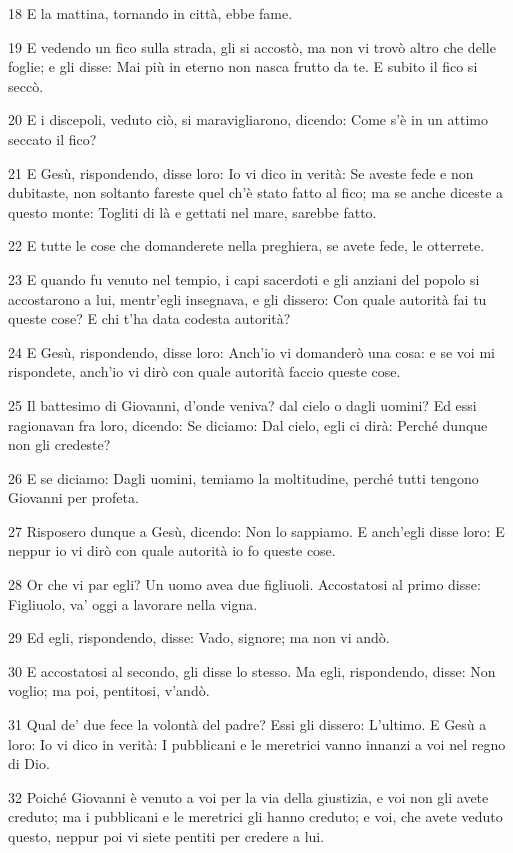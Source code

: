 \par 18 E la mattina, tornando in città, ebbe fame.
\par 19 E vedendo un fico sulla strada, gli si accostò, ma non vi trovò altro che delle foglie; e gli disse: Mai più in eterno non nasca frutto da te. E subito il fico si seccò.
\par 20 E i discepoli, veduto ciò, si maravigliarono, dicendo: Come s'è in un attimo seccato il fico?
\par 21 E Gesù, rispondendo, disse loro: Io vi dico in verità: Se aveste fede e non dubitaste, non soltanto fareste quel ch'è stato fatto al fico; ma se anche diceste a questo monte: Togliti di là e gettati nel mare, sarebbe fatto.
\par 22 E tutte le cose che domanderete nella preghiera, se avete fede, le otterrete.
\par 23 E quando fu venuto nel tempio, i capi sacerdoti e gli anziani del popolo si accostarono a lui, mentr'egli insegnava, e gli dissero: Con quale autorità fai tu queste cose? E chi t'ha data codesta autorità?
\par 24 E Gesù, rispondendo, disse loro: Anch'io vi domanderò una cosa: e se voi mi rispondete, anch'io vi dirò con quale autorità faccio queste cose.
\par 25 Il battesimo di Giovanni, d'onde veniva? dal cielo o dagli uomini? Ed essi ragionavan fra loro, dicendo: Se diciamo: Dal cielo, egli ci dirà: Perché dunque non gli credeste?
\par 26 E se diciamo: Dagli uomini, temiamo la moltitudine, perché tutti tengono Giovanni per profeta.
\par 27 Risposero dunque a Gesù, dicendo: Non lo sappiamo. E anch'egli disse loro: E neppur io vi dirò con quale autorità io fo queste cose.
\par 28 Or che vi par egli? Un uomo avea due figliuoli. Accostatosi al primo disse: Figliuolo, va' oggi a lavorare nella vigna.
\par 29 Ed egli, rispondendo, disse: Vado, signore; ma non vi andò.
\par 30 E accostatosi al secondo, gli disse lo stesso. Ma egli, rispondendo, disse: Non voglio; ma poi, pentitosi, v'andò.
\par 31 Qual de' due fece la volontà del padre? Essi gli dissero: L'ultimo. E Gesù a loro: Io vi dico in verità: I pubblicani e le meretrici vanno innanzi a voi nel regno di Dio.
\par 32 Poiché Giovanni è venuto a voi per la via della giustizia, e voi non gli avete creduto; ma i pubblicani e le meretrici gli hanno creduto; e voi, che avete veduto questo, neppur poi vi siete pentiti per credere a lui.
